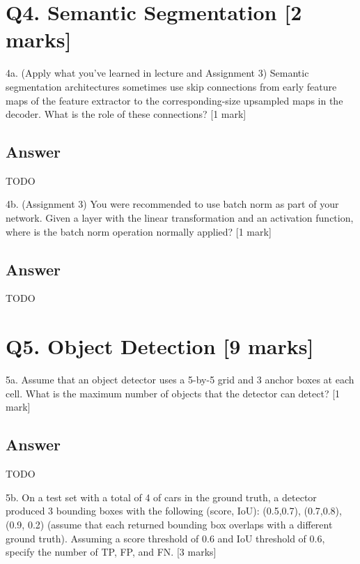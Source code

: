 \documentclass[
	12pt, %
]{fphw}
\begin{document}
\section*{Q4. Semantic Segmentation [2 marks]}
\begin{problem}
4a. (Apply what you’ve learned in lecture and Assignment 3) Semantic segmentation
architectures sometimes use skip connections from early feature maps of the feature
extractor to the corresponding-size upsampled maps in the decoder. What is the role of
these connections? [1 mark]
\end{problem}
\subsection*{Answer}
TODO
\begin{problem}
4b. (Assignment 3) You were recommended to use batch norm as part of your network.
Given a layer with the linear transformation and an activation function, where is the batch
norm operation normally applied? [1 mark]
\end{problem}
\subsection*{Answer}
TODO
\section*{Q5. Object Detection [9 marks] }
\begin{problem}
5a. Assume that an object detector uses a 5-by-5 grid and 3 anchor boxes at each cell.
What is the maximum number of objects that the detector can detect? [1 mark]
\end{problem}
\subsection*{Answer}
TODO
\begin{problem}
5b. On a test set with a total of 4 of cars in the ground truth, a detector produced 3
bounding boxes with the following (score, IoU): (0.5,0.7), (0.7,0.8), (0.9, 0.2) (assume
that each returned bounding box overlaps with a different ground truth). Assuming a
score threshold of 0.6 and IoU threshold of 0.6, specify the number of TP, FP, and FN. [3
		marks]
\end{problem}
\end{document}

